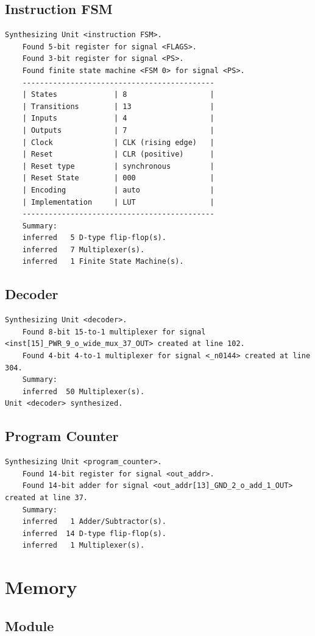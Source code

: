 \documentclass[11pt]{article}
\begin{document}
\subsection{Instruction FSM}
\begin{lstlisting}
Synthesizing Unit <instruction FSM>.
    Found 5-bit register for signal <FLAGS>.
    Found 3-bit register for signal <PS>.
    Found finite state machine <FSM 0> for signal <PS>.
    --------------------------------------------
    | States             | 8                   |
    | Transitions        | 13                  |
    | Inputs             | 4                   |
    | Outputs            | 7                   |
    | Clock              | CLK (rising edge)   |
    | Reset              | CLR (positive)      |
    | Reset type         | synchronous         |
    | Reset State        | 000                 |
    | Encoding           | auto                |
    | Implementation     | LUT                 |
    --------------------------------------------
    Summary:
    inferred   5 D-type flip-flop(s).
    inferred   7 Multiplexer(s).
    inferred   1 Finite State Machine(s).
\end{lstlisting}
\subsection{Decoder}
\begin{lstlisting}
Synthesizing Unit <decoder>.
    Found 8-bit 15-to-1 multiplexer for signal <inst[15]_PWR_9_o_wide_mux_37_OUT> created at line 102.
    Found 4-bit 4-to-1 multiplexer for signal <_n0144> created at line 304.
    Summary:
    inferred  50 Multiplexer(s).
Unit <decoder> synthesized.
\end{lstlisting}
\subsection{Program Counter}
\begin{lstlisting}
Synthesizing Unit <program_counter>.
    Found 14-bit register for signal <out_addr>.
    Found 14-bit adder for signal <out_addr[13]_GND_2_o_add_1_OUT> created at line 37.
    Summary:
    inferred   1 Adder/Subtractor(s).
    inferred  14 D-type flip-flop(s).
    inferred   1 Multiplexer(s).
\end{lstlisting}
\section{Memory}
\subsection{Module}
\tiny 
\end{document}

